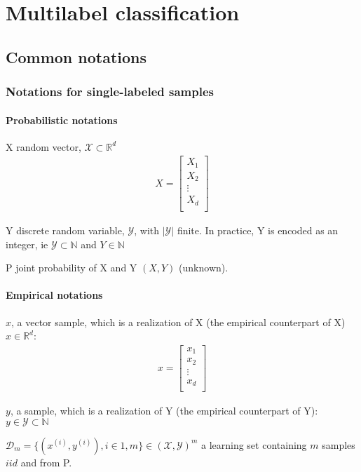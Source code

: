 \chapter{Multilabel classification} %
\label{cha:multilabel_classification}


\section*{Common notations}


\subsection*{Notations for single-labeled samples}

\subsubsection*{Probabilistic notations}

\begin{outline}
\1 X random vector, $\mathcal{X} \subset \mathbb{R}^d$
\begin{align}
	X = \left[
	\begin{array}{cccc}
		X_{1} \\
		X_{2} \\
		\vdots\\
		X_{d} \\
	\end{array}\right]
\end{align}

\1 Y discrete random variable, $\mathcal{Y} $, with $|\mathcal{Y}|$ finite. In practice, Y is encoded as an integer, ie $\mathcal{Y} \subset \mathbb{N} $ and $Y \in \mathbb{N}$

\1 P joint probability of X and Y $(X,Y)$ (unknown).
\end{outline}

\subsubsection*{Empirical notations}

\begin{outline}
\1 $x$, a vector sample, which is a realization of X (the empirical counterpart of X) $x \in \mathbb{R}^d$:
\begin{align}
	x = \left[
	\begin{array}{cccc}
		x_{1} \\
		x_{2} \\
		\vdots\\
		x_{d} \\
	\end{array}\right]
\end{align}

\1 $y$, a sample, which is a realization of Y (the empirical counterpart of Y): $y \in \mathcal{Y} \subset \mathbb{N}$

\1 $ \mathcal{D}_m = \{(x^{(i)}, y^{(i)}), i \in 1,m\} \in (\mathcal{X},\mathcal{Y})^m$ a learning set containing $m$ samples $iid$ and from P.\\
\end{outline}

